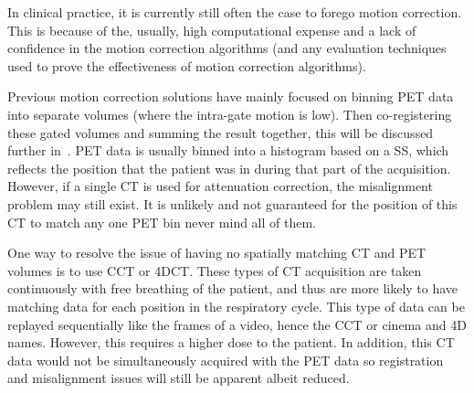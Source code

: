         In clinical practice, it is currently still often the case to forego motion correction. This is because of the, usually, high computational expense and a lack of confidence in the motion correction algorithms (and any evaluation techniques used to prove the effectiveness of motion correction algorithms).%
    
        Previous motion correction solutions have mainly focused on binning \gls{PET} data into separate volumes (where the intra-gate motion is low). Then co-registering these gated volumes and summing the result together, this will be discussed further in~. \gls{PET} data is usually binned into a histogram based on a \gls{SS}, which reflects the position that the patient was in during that part of the acquisition. However, if a single \gls{CT} is used for attenuation correction, the misalignment problem may still exist. It is unlikely and not guaranteed for the position of this \gls{CT} to match any one \gls{PET} bin never mind all of them.
        
        One way to resolve the issue of having no spatially matching \gls{CT} and \gls{PET} volumes is to use \gls{CCT} or \gls{4DCT}. These types of \gls{CT} acquisition are taken continuously with free breathing of the patient, and thus are more likely to have matching data for each position in the respiratory cycle.  This type of data can be replayed sequentially like the frames of a video, hence the \gls{CCT} or cinema and \gls{4D} names. However, this requires a higher dose to the patient. In addition, this \gls{CT} data would not be simultaneously acquired with the \gls{PET} data so registration and misalignment issues will still be apparent albeit reduced.
        
